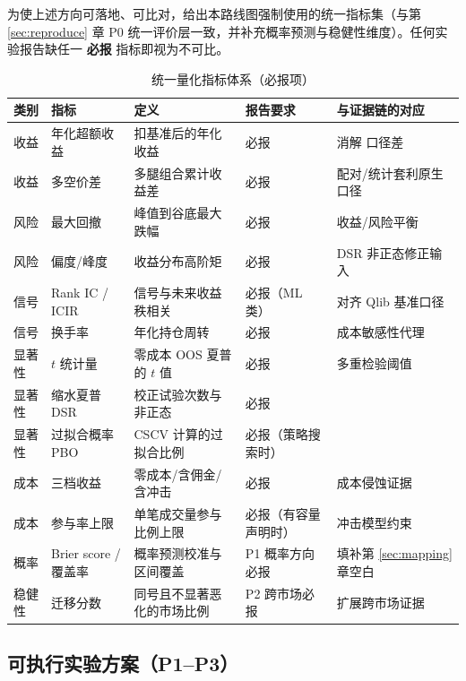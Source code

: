 为使上述方向可落地、可比对，给出本路线图强制使用的统一指标集（与第 \ref{sec:reproduce} 章 P0 统一评价层一致，并补充概率预测与稳健性维度）。任何实验报告缺任一 \textbf{必报} 指标即视为不可比。

\begin{table}[htbp]
\centering
\caption{统一量化指标体系（必报项）}
\label{tab:metrics}
\footnotesize
\begin{tabular}{@{}>{\raggedright\arraybackslash}p{1.4cm}>{\raggedright\arraybackslash}p{3.2cm}>{\raggedright\arraybackslash}p{3.2cm}>{\raggedright\arraybackslash}p{2.8cm}>{\raggedright\arraybackslash}p{3.2cm}@{}}
\toprule
类别 & 指标 & 定义 & 报告要求 & 与证据链的对应 \\
\midrule
收益 & 年化超额收益 & 扣基准后的年化收益 & 必报 & 消解 \cite{gatev2006,dofaff2012} 口径差 \\
收益 & 多空价差 & 多腿组合累计收益差 & 必报 & 配对/统计套利原生口径 \\
风险 & 最大回撤 & 峰值到谷底最大跌幅 & 必报 & 收益/风险平衡 \\
风险 & 偏度/峰度 & 收益分布高阶矩 & 必报 & DSR 非正态修正输入 \\
信号 & Rank IC / ICIR & 信号与未来收益秩相关 & 必报（ML 类） & 对齐 Qlib \cite{qlib} 基准口径 \\
信号 & 换手率 & 年化持仓周转 & 必报 & 成本敏感性代理 \\
显著性 & $t$ 统计量 & 零成本 OOS 夏普的 $t$ 值 & 必报 & 多重检验阈值 \cite{harveylz2016} \\
显著性 & 缩水夏普 DSR & 校正试验次数与非正态 & 必报 & \cite{bailey2014dsr} \\
显著性 & 过拟合概率 PBO & CSCV 计算的过拟合比例 & 必报（策略搜索时） & \cite{bailey2014pbo} \\
成本 & 三档收益 & 零成本/含佣金/含冲击 & 必报 & 成本侵蚀证据 \cite{martin2011} \\
成本 & 参与率上限 & 单笔成交量参与比例上限 & 必报（有容量声明时） & 冲击模型约束 \\
概率 & Brier score / 覆盖率 & 概率预测校准与区间覆盖 & P1 概率方向必报 & 填补第 \ref{sec:mapping} 章空白 \\
稳健性 & 迁移分数 & 同号且不显著恶化的市场比例 & P2 跨市场必报 & 扩展跨市场证据 \\
\bottomrule
\end{tabular}
\end{table}

\subsection{可执行实验方案（P1--P3）}\label{sec:experiments}

